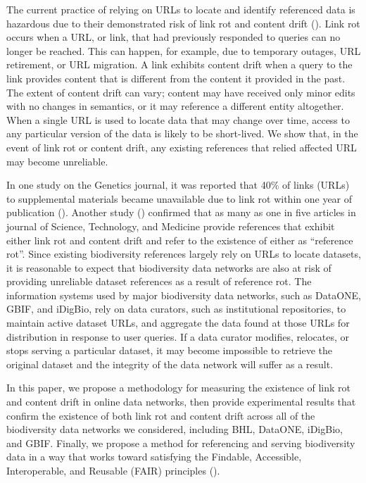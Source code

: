 \documentclass[10pt,letterpaper]{article}
\begin{document}
The current practice of relying on URLs to locate and identify referenced data is hazardous due to their demonstrated risk of link rot and content drift (\cite{Klein_2014}). Link rot occurs when a URL, or link, that had previously responded to queries can no longer be reached. This can happen, for example, due to temporary outages, URL retirement, or URL migration. A link exhibits content drift when a query to the link provides content that is different from the content it provided in the past. The extent of content drift can vary; content may have received only minor edits with no changes in semantics, or it may reference a different entity altogether. When a single URL is used to locate data that may change over time, access to any particular version of the data is likely to be short-lived. We show that, in the event of link rot or content drift, any existing references that relied affected URL may become unreliable.

In one study on the Genetics journal, it was reported that 40\% of links (URLs) to supplemental materials became unavailable due to link rot within one year of publication (\cite{Vision_2010}). Another study (\cite{Klein_2014}) confirmed that as many as one in five articles in journal of Science, Technology, and Medicine provide references that exhibit either link rot and content drift and refer to the existence of either as “reference rot”. Since existing biodiversity references largely rely on URLs to locate datasets, it is reasonable to expect that biodiversity data networks are also at risk of providing unreliable dataset references as a result of reference rot. The information systems used by major biodiversity data networks, such as DataONE, GBIF, and iDigBio, rely on data curators, such as institutional repositories, to maintain active dataset URLs, and aggregate the data found at those URLs for distribution in response to user queries. If a data curator modifies, relocates, or stops serving a particular dataset, it may become impossible to retrieve the original dataset and the integrity of the data network will suffer as a result.

In this paper, we propose a methodology for measuring the existence of link rot and content drift in online data networks, then provide experimental results that confirm the existence of both link rot and content drift across all of the biodiversity data networks we considered, including BHL, DataONE, iDigBio, and GBIF. Finally, we propose a method for referencing and serving biodiversity data in a way that works toward satisfying the Findable, Accessible, Interoperable, and Reusable (FAIR) principles (\cite{Wilkinson_2016}).
\end{document}
